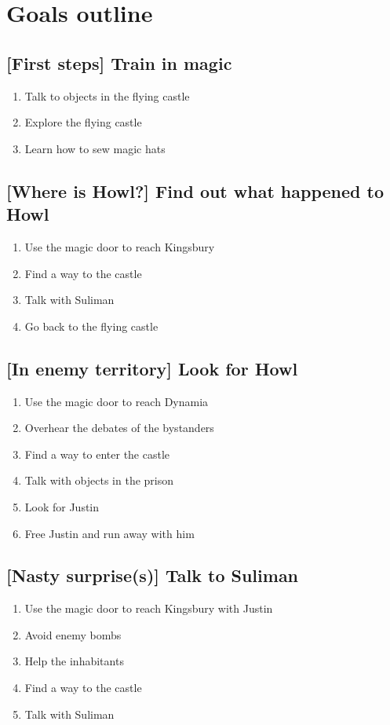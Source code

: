 \section{Goals outline}

\subsection{[First steps] Train in magic}
\begin{enumerate}
\item Talk to objects in the flying castle
\item Explore the flying castle
\item Learn how to sew magic hats
\end{enumerate}

\subsection{[Where is Howl?] Find out what happened to Howl}
\begin{enumerate}
\item Use the magic door to reach Kingsbury
\item Find a way to the castle
\item Talk with Suliman
\item Go back to the flying castle
\end{enumerate}

\subsection{[In enemy territory] Look for Howl}
\begin{enumerate}
\item Use the magic door to reach Dynamia
\item Overhear the debates of the bystanders
\item Find a way to enter the castle
\item Talk with objects in the prison
\item Look for Justin
\item Free Justin and run away with him
\end{enumerate}

\subsection{[Nasty surprise(s)] Talk to Suliman}
\begin{enumerate}
\item Use the magic door to reach Kingsbury with Justin
\item Avoid enemy bombs
\item Help the inhabitants
\item Find a way to the castle
\item Talk with Suliman
\end{enumerate}

